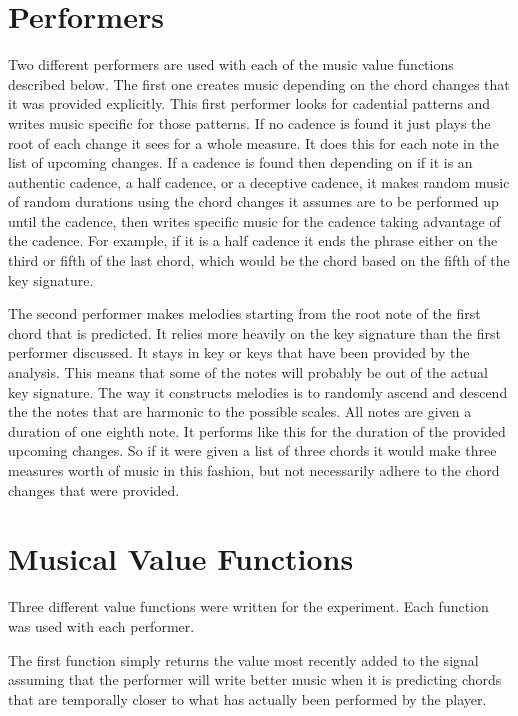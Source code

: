 \documentclass[12pt]{ucthesis}
\begin{document}
\section{Performers}
\label {performers}

Two different performers are used with each of the music value functions described below. The first one creates music depending on the chord changes that it was provided explicitly. This first performer looks for cadential patterns and writes music specific for those patterns. If no cadence is found it just plays the root of each change it sees for a whole measure. It does this for each note in the list of upcoming changes. If a cadence is found then depending on if it is an authentic cadence, a half cadence, or a deceptive cadence, it makes random music of random durations using the chord changes it assumes are to be performed up until the cadence, then writes specific music for the cadence taking advantage of the cadence. For example, if it is a half cadence it ends the phrase either on the third or fifth of the last chord, which would be the chord based on the fifth of the key signature.

The second performer makes melodies starting from the root note of the first chord that is predicted. It relies more heavily on the key signature than the first performer discussed. It stays in key or keys that have been provided by the analysis. This means that some of the notes will probably be out of the actual key signature. The way it constructs melodies is to randomly ascend and descend the the notes that are harmonic to the possible scales. All notes are given a duration of one eighth note. It performs like this for the duration of the provided upcoming changes. So if it were given a list of three chords it would make three measures worth of music in this fashion, but not necessarily adhere to the chord changes that were provided.

\section{Musical Value Functions}
\label {musical-value-functions}
Three different value functions were written for the experiment. Each function was used with each performer. 

The first function simply returns the value most recently added to the signal assuming that the performer will write better music when it is predicting chords that are temporally closer to what has actually been performed by the player.  
\end{document}

